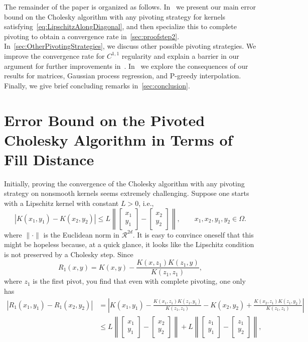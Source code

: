 \documentclass{amsart}
\theoremstyle{definition}
\theoremstyle{remark}
\begin{document}
The remainder of the paper is organized as follows. In~ we present our main error bound on the Cholesky algorithm with any pivoting strategy for kernels satisfying~\cref{eq:LipschitzAlongDiagonal}, and then specialize this to complete pivoting to obtain a convergence rate in~\cref{sec:proofstep2}. In~\cref{sec:OtherPivotingStrategies}, we discuss other possible pivoting strategies. We improve the convergence rate for $C^{1,1}$ regularity and explain a barrier in our argument for further improvements in~. In~ we explore the consequences of our results for matrices, Gaussian process regression, and P-greedy interpolation. Finally, we give brief concluding remarks in~\cref{sec:conclusion}.

\section{Error Bound on the Pivoted Cholesky Algorithm in Terms of Fill Distance}\label{sec:proof}
Initially, proving the convergence of the Cholesky algorithm with any pivoting strategy on nonsmooth kernels seems extremely challenging. Suppose one starts with a Lipschitz kernel with constant $L>0$, i.e., 
\[
|K(x_1,y_1) - K(x_2,y_2)| \leq L\left\| \begin{bmatrix}x_1\\y_1\end{bmatrix} - \begin{bmatrix}x_2\\y_2\end{bmatrix}\right\|,\qquad x_1,x_2,y_1,y_2\in\Omega. 
\] 
where $\|\cdot\|$ is the Euclidean norm in $\mathcal{R}^{2d}$. 
It is easy to convince oneself that this might be hopeless because, at a quick glance, it looks like the Lipschitz condition is not preserved by a Cholesky step. Since
\[
R_1(x,y) = K(x,y) - \frac{K(x,z_1)K(z_1,y)}{K(z_1,z_1)},
\]
where $z_1$ is the first pivot, you find that even with complete pivoting, one only has  
\[
\begin{aligned}
|R_1(x_1,y_1) - R_1(x_2,y_2)| &= \left|K(x_1,y_1) - \frac{K(x_1,z_1)K(z_1,y_1)}{K(z_1,z_1)} -K(x_2,y_2) + \frac{K(x_2,z_1)K(z_1,y_2)}{K(z_1,z_1)} \right|\\
&\leq L\left\| \begin{bmatrix}x_1\\y_1\end{bmatrix} - \begin{bmatrix}x_2\\y_2\end{bmatrix}\right\| + L\left\| \begin{bmatrix}z_1\\y_1\end{bmatrix} - \begin{bmatrix}z_1\\y_2\end{bmatrix}\right\|,
\end{aligned} 
\]
\end{document}
